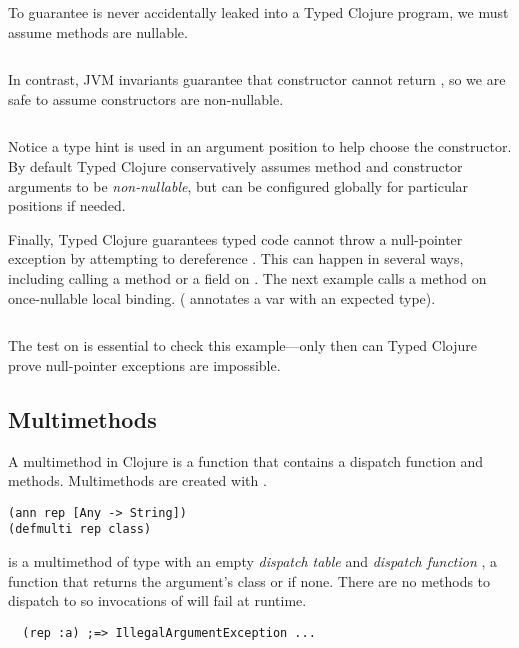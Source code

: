 To guarantee  is never accidentally leaked into a Typed Clojure program,
we must assume methods are nullable.

\begin{exmp}
\inputminted[firstline=12,lastline=13]{clojure}{code/demo/src/demo/parent3.clj}
\end{exmp}

In contrast, JVM invariants guarantee that  constructor cannot return ,
so we are safe to assume constructors are non-nullable.

\begin{Code}
\begin{exmp}
\inputminted[firstline=15,lastline=16]{clojure}{code/demo/src/demo/parent3.clj}
\end{exmp}
\end{Code}

Notice a type hint is used in an argument position to help choose the 
constructor. By default Typed Clojure conservatively assumes method and constructor arguments to be \emph{non-nullable},
but can be configured globally for particular positions if needed.

Finally, Typed Clojure guarantees typed code cannot throw a null-pointer exception
by attempting to dereference . This can happen in several ways, including
calling a method or a field on .
The next example calls a method on once-nullable local binding.
( annotates a var with an expected type).

\begin{exmp}
\inputminted[firstline=5,lastline=8]{clojure}{code/demo/src/demo/parent3.clj}
\end{exmp}

The test on  is essential to check this example---only then can Typed Clojure
prove null-pointer exceptions are impossible.

\subsection{Multimethods}

A multimethod in Clojure is a function that contains a dispatch
function and methods. Multimethods are created with {}.
\begin{verbatim}
(ann rep [Any -> String])
(defmulti rep class)
\end{verbatim}
 is a multimethod of type  with an empty \emph{dispatch table}
and \emph{dispatch function} , a function that returns the argument's class or  if none.
There are no methods to dispatch to so invocations of  will fail at runtime.
\begin{verbatim}
  (rep :a) ;=> IllegalArgumentException ...
\end{verbatim}

